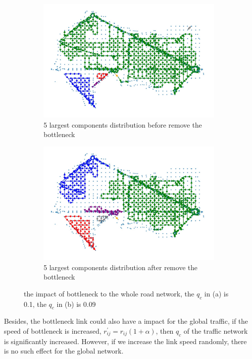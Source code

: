 \begin{figure}
\centering
\begin{subfigure}[b]{0.8\linewidth}
    \centering
    \includegraphics[width=\linewidth]{images/after.png}
    \caption{5 largest components distribution before remove the bottleneck}
    \label{fig: bottleneck after}
\end{subfigure}
\begin{subfigure}[b]{0.8\linewidth}
    \centering
    \includegraphics[width=\linewidth]{images/before.png}
    \caption{5 largest components distribution after remove the bottleneck}
    \label{fig: bottleneck before}
\end{subfigure}
\caption{the impact of bottleneck to the whole road network, the $q_c$ in (a) is 0.1, the $q_c$ in (b) is 0.09}
\label{fig: bottleneck}
\end{figure}
Besides, the bottleneck link could also have a impact for the global traffic, if the speed of bottleneck is increased, $r_{i j}^{'}=r_{i j}(1+\alpha)$, then $q_c$ of the traffic network is significantly increased. However, if we increase the link speed randomly, there is no such effect for the global network.
